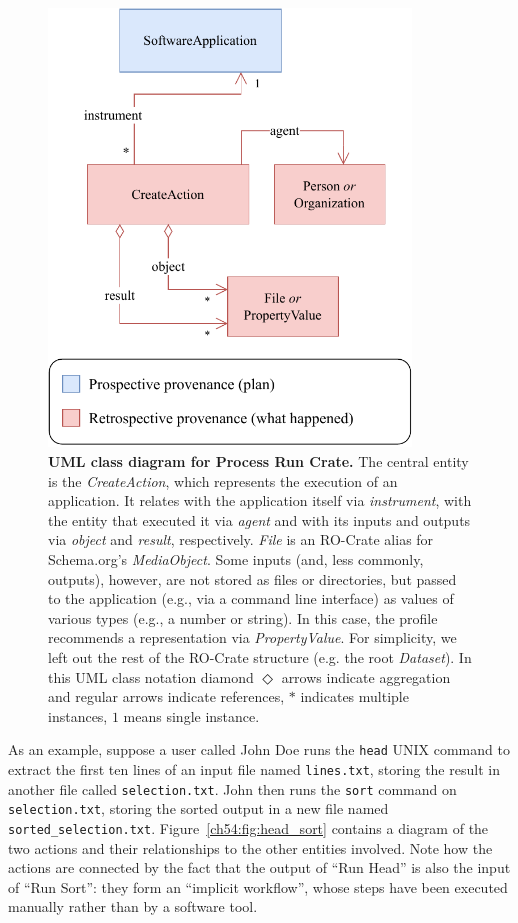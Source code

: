 \begin{figure}[htp]
\centering
\includegraphics[width=26em]{figures/ch54/wrroc-figure1.drawio.pdf}
\caption[UML class diagram for Process Run Crate]{{\bf UML class diagram for Process Run Crate.}
The central entity is the \emph{CreateAction}, which represents the execution of an application.
It relates with the application itself via \emph{instrument}, with the entity that executed it via \emph{agent} and with its inputs and outputs via \emph{object}
and \emph{result}, respectively. 
\emph{File} is an RO-Crate alias for Schema.org's \emph{MediaObject}.
Some inputs (and, less commonly, outputs), however, are not stored as files or directories, but passed to the application (e.g., via a command line interface) as values of various types (e.g., a number or string). In this case, the profile recommends a representation via \emph{PropertyValue}. 
For simplicity, we left out the rest of the RO-Crate structure (e.g. the root \emph{Dataset}). In this UML class notation diamond $\Diamond$ arrows indicate aggregation and regular arrows indicate references, $*$ indicates multiple instances, $1$ means single instance.  
}
\label{ch54:fig:process_crate_er}
\end{figure}

As an example,
suppose a user called John Doe runs the \texttt{head} UNIX command to extract the first ten lines of an input file named \texttt{lines.txt}, storing the result in another file called \texttt{selection.txt}.
John then runs the \texttt{sort}
command on \texttt{selection.txt}, storing the sorted output in a new file named \texttt{sorted\_selection.txt}.
Figure~\vref{ch54:fig:head_sort} contains a diagram of the two actions and their relationships to the other entities involved.
Note how the actions are connected by the fact that the output of ``Run Head'' is also the input of ``Run Sort'': they form an ``implicit workflow'', whose steps have been executed manually rather than by a software tool.

